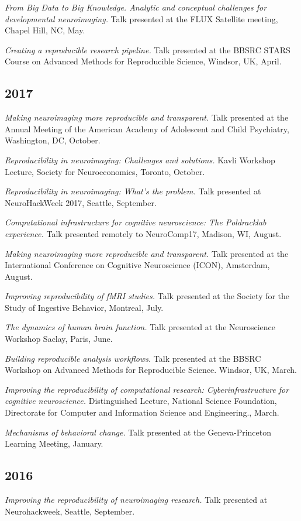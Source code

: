 \documentclass[10pt, letterpaper]{article}
\begin{document}
\textit{From Big Data to Big Knowledge. Analytic and conceptual challenges for developmental neuroimaging.} Talk presented at the FLUX Satellite meeting, Chapel Hill, NC, May.

\textit{Creating a reproducible research pipeline.} Talk presented at the BBSRC STARS Course on Advanced Methods for Reproducible Science, Windsor, UK, April.

\subsection*{2017}\textit{Making neuroimaging more reproducible and transparent.} Talk presented at the Annual Meeting of the American Academy of Adolescent and Child Psychiatry, Washington, DC, October.

\textit{Reproducibility in neuroimaging: Challenges and solutions.} Kavli Workshop Lecture, Society for Neuroeconomics, Toronto, October.

\textit{Reproducibility in neuroimaging: What's the problem.} Talk presented at NeuroHackWeek 2017, Seattle, September.

\textit{Computational infrastructure for cognitive neuroscience: The Poldracklab experience.} Talk presented remotely to NeuroComp17, Madison, WI, August.

\textit{Making neuroimaging more reproducible and transparent.} Talk presented at the International Conference on Cognitive Neuroscience (ICON), Amsterdam, August.

\textit{Improving reproducibility of fMRI studies.} Talk presented at the Society for the Study of Ingestive Behavior, Montreal, July.

\textit{The dynamics of human brain function.} Talk presented at the Neuroscience Workshop Saclay, Paris, June.

\textit{Building reproducible analysis workflows.} Talk presented at the BBSRC Workshop on Advanced Methods for Reproducible Science. Windsor, UK, March.

\textit{Improving the reproducibility of computational research: Cyberinfrastructure for cognitive neuroscience.} Distinguished Lecture, National Science Foundation, Directorate for Computer and Information Science and Engineering., March.

\textit{Mechanisms of behavioral change.} Talk presented at the Geneva-Princeton Learning Meeting, January.

\subsection*{2016}\textit{ Improving the reproducibility of neuroimaging research.} Talk presented at Neurohackweek, Seattle, September.
\end{document}
